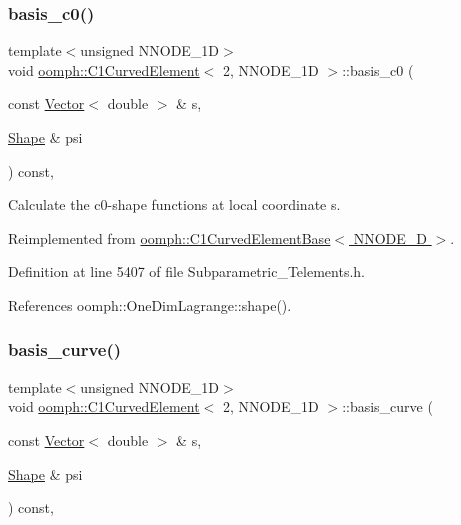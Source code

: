 \subsubsection{\texorpdfstring{basis\+\_\+c0()}{basis\_c0()}}
{\footnotesize\ttfamily template$<$unsigned N\+N\+O\+D\+E\+\_\+1D$>$ \\
void \hyperlink{classoomph_1_1C1CurvedElement}{oomph\+::\+C1\+Curved\+Element}$<$ 2, N\+N\+O\+D\+E\+\_\+1D $>$\+::basis\+\_\+c0 (\begin{DoxyParamCaption}\item[{const \hyperlink{classoomph_1_1Vector}{Vector}$<$ double $>$ \&}]{s,  }\item[{\hyperlink{classoomph_1_1Shape}{Shape} \&}]{psi }\end{DoxyParamCaption}) const\hspace{0.3cm}{\ttfamily [inline]}, {\ttfamily [virtual]}}



Calculate the c0-\/shape functions at local coordinate s. 



Reimplemented from \hyperlink{classoomph_1_1C1CurvedElementBase_af8dc76a0a5b61c9995e172007b96a3bd}{oomph\+::\+C1\+Curved\+Element\+Base$<$ N\+N\+O\+D\+E\+\_\+D $>$}.



Definition at line 5407 of file Subparametric\+\_\+\+Telements.\+h.



References oomph\+::\+One\+Dim\+Lagrange\+::shape().

\mbox{\label{classoomph_1_1C1CurvedElement_3_012_00_01NNODE__1D_01_4_a97e774d78da4118400b554ddf59fdbeb}} 
\subsubsection{\texorpdfstring{basis\+\_\+curve()}{basis\_curve()}}
{\footnotesize\ttfamily template$<$unsigned N\+N\+O\+D\+E\+\_\+1D$>$ \\
void \hyperlink{classoomph_1_1C1CurvedElement}{oomph\+::\+C1\+Curved\+Element}$<$ 2, N\+N\+O\+D\+E\+\_\+1D $>$\+::basis\+\_\+curve (\begin{DoxyParamCaption}\item[{const \hyperlink{classoomph_1_1Vector}{Vector}$<$ double $>$ \&}]{s,  }\item[{\hyperlink{classoomph_1_1Shape}{Shape} \&}]{psi }\end{DoxyParamCaption}) const\hspace{0.3cm}{\ttfamily [inline]}, {\ttfamily [virtual]}}

